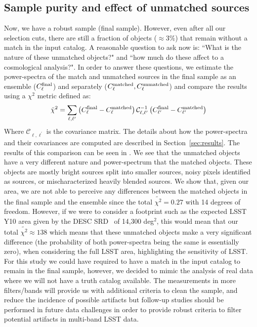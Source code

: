 \documentclass[twocolumn]{aastex62}
\begin{document}
\subsection{Sample purity and effect of unmatched sources}
Now, we have a robust sample (final sample). However, even after all our selection cuts, there are still a fraction of objects ($\approx 3\%$) that remain without a match in the input catalog. A reasonable question to ask now is: ``What is the nature of these unmatched objects?" and ``how much do these affect to a cosmological analysis?". In order to answer these questions, we estimate the power-spectra of the match and unmatched sources in the final sample as an ensemble ($C_{\ell}^{\rm{final}}$) and separately ($C_{\ell}^{\rm{matched}}, C_{\ell}^{\rm{unmatched}}$) and compare the results using a $\chi^{2}$ metric defined as: 
\begin{equation}
\tilde{\chi}^{2} = \sum_{\ell,\ell^{\prime}} \left(C_{\ell}^{\rm{final}}-C_{\ell}^{\rm{matched}}\right) \mathcal{C}_{\ell, \ell^{\prime}}^{-1}  \left(C_{\ell^{\prime}}^{\rm{final}}-C_{\ell^{\prime}}^{\rm{matched}}\right)
\end{equation} 
Where $\mathcal{C}_{\ell,\ell^{\prime}}$ is the covariance matrix. The details about how the power-spectra and their covariances are computed are described in Section~\ref{sec:results}. The results of this comparison can be seen in . We see that the unmatched objects have a very different nature and power-spectrum that the matched objects. These objects are mostly bright sources split into smaller sources, noisy pixels identified as sources, or mischaracterized heavily blended sources. We show that, given our area, we are not able to perceive any differences between the matched objects in the final sample and the ensemble since the total $\tilde{\chi^{2}}=0.27$ with 14 degrees of freedom. However, if we were to consider a footprint such as the expected LSST Y10 area given by the DESC SRD~\citep{2018arXiv180901669T} of 14,300 deg$^{2}$, this would mean that our total $\tilde{\chi^{2}} \approx 138$ which means that these unmatched objects make a very significant difference (the probability of both power-spectra being the same is essentially zero), when considering the full LSST area, highlighting the sensitivity of LSST. For this study we could have required to have a match in the input catalog to remain in the final sample, however, we decided to mimic the analysis of real data where we will not have a truth catalog available. The measurements in more filters/bands will provide us with additional criteria to clean the sample, and reduce the incidence of possible artifacts but follow-up studies should be performed in future data challenges in order to provide robust criteria to filter potential artifacts in multi-band LSST data.
\end{document}
